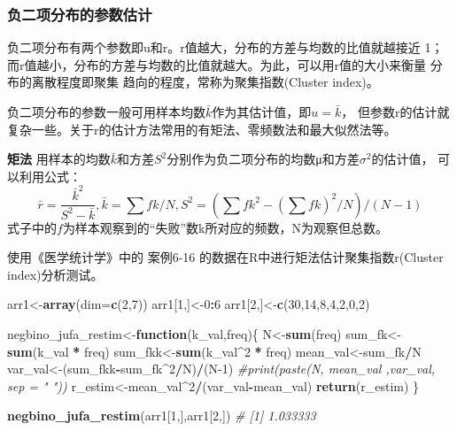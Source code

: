 \documentclass[
]{article}
\newenvironment{Shaded}{\begin{snugshade}}{\end{snugshade}}
\newcommand{\CommentTok}[1]{\textcolor[rgb]{0.56,0.35,0.01}{\textit{#1}}}
\newcommand{\ControlFlowTok}[1]{\textcolor[rgb]{0.13,0.29,0.53}{\textbf{#1}}}
\newcommand{\DataTypeTok}[1]{\textcolor[rgb]{0.13,0.29,0.53}{#1}}
\newcommand{\DecValTok}[1]{\textcolor[rgb]{0.00,0.00,0.81}{#1}}
\newcommand{\KeywordTok}[1]{\textcolor[rgb]{0.13,0.29,0.53}{\textbf{#1}}}
\newcommand{\NormalTok}[1]{#1}
\newcommand{\OperatorTok}[1]{\textcolor[rgb]{0.81,0.36,0.00}{\textbf{#1}}}
\newcommand{\StringTok}[1]{\textcolor[rgb]{0.31,0.60,0.02}{#1}}
\begin{document}
\hypertarget{ux8d1fux4e8cux9879ux5206ux5e03ux7684ux53c2ux6570ux4f30ux8ba1}{%
\subsubsection{负二项分布的参数估计}\label{ux8d1fux4e8cux9879ux5206ux5e03ux7684ux53c2ux6570ux4f30ux8ba1}}

负二项分布有两个参数即u和r。r值越大，分布的方差与均数的比值就越接近 1；
而r值越小，分布的方差与均数的比值就越大。为此，可以用r值的大小来衡量
分布的离散程度即聚集 趋向的程度，常称为聚集指数(Cluster index)。

负二项分布的参数一般可用样本均数\(\bar{k}\)作为其估计值，即\(u=\bar{k}\)，
但参数r的估计就复杂一些。关于r的估计方法常用的有矩法、零频数法和最大似然法等。

\textbf{矩法}
用样本的均数\(\bar{k}\)和方差\(S^2\)分别作为负二项分布的均数μ和方差\(\sigma^2\)的估计值，
可以利用公式：
\[\bar{r}=\frac{\bar{k}^2}{S^2-\bar{k}}, \bar{k}=\sum{fk}/N, S^2=(\sum{fk^2}-(\sum{fk})^2/N)/(N-1)\]
式子中的\(f\)为样本观察到的``失败''数k所对应的频数，N为观察但总数。

使用《医学统计学》中的 案例6-16 的数据在R中进行矩法估计聚集指数r(Cluster index)分析测试。

\begin{Shaded}
\begin{Highlighting}[]
\NormalTok{arr1<-}\KeywordTok{array}\NormalTok{(}\DataTypeTok{dim=}\KeywordTok{c}\NormalTok{(}\DecValTok{2}\NormalTok{,}\DecValTok{7}\NormalTok{))}
\NormalTok{arr1[}\DecValTok{1}\NormalTok{,]<-}\DecValTok{0}\OperatorTok{:}\DecValTok{6}
\NormalTok{arr1[}\DecValTok{2}\NormalTok{,]<-}\KeywordTok{c}\NormalTok{(}\DecValTok{30}\NormalTok{,}\DecValTok{14}\NormalTok{,}\DecValTok{8}\NormalTok{,}\DecValTok{4}\NormalTok{,}\DecValTok{2}\NormalTok{,}\DecValTok{0}\NormalTok{,}\DecValTok{2}\NormalTok{)}

\NormalTok{negbino_jufa_restim<-}\ControlFlowTok{function}\NormalTok{(k_val,freq)\{}
\NormalTok{  N<-}\KeywordTok{sum}\NormalTok{(freq)}
\NormalTok{  sum_fk<-}\KeywordTok{sum}\NormalTok{(k_val }\OperatorTok{*}\StringTok{ }\NormalTok{freq)}
\NormalTok{  sum_fkk<-}\KeywordTok{sum}\NormalTok{(k_val}\OperatorTok{^}\DecValTok{2} \OperatorTok{*}\StringTok{ }\NormalTok{freq)}
\NormalTok{  mean_val<-sum_fk}\OperatorTok{/}\NormalTok{N}
\NormalTok{  var_val<-(sum_fkk}\OperatorTok{-}\NormalTok{sum_fk}\OperatorTok{^}\DecValTok{2}\OperatorTok{/}\NormalTok{N)}\OperatorTok{/}\NormalTok{(N}\DecValTok{-1}\NormalTok{)}
  \CommentTok{#print(paste(N, mean_val ,var_val, sep = "   "))}
\NormalTok{  r_estim<-mean_val}\OperatorTok{^}\DecValTok{2}\OperatorTok{/}\NormalTok{(var_val}\OperatorTok{-}\NormalTok{mean_val)}
  \KeywordTok{return}\NormalTok{(r_estim)}
\NormalTok{\}}

\KeywordTok{negbino_jufa_restim}\NormalTok{(arr1[}\DecValTok{1}\NormalTok{,],arr1[}\DecValTok{2}\NormalTok{,])}
\CommentTok{# [1] 1.033333}
\end{Highlighting}
\end{Shaded}
\end{document}
